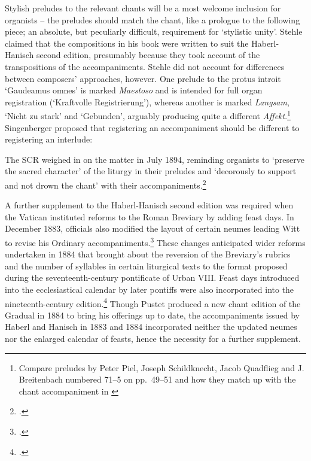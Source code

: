   {\cite[unpaginated `Vorbemerkung']{StehlePraeludiaorganiad1892}}
{Stylish preludes to the relevant chants will be a most welcome inclusion for organists -- the preludes should match the chant, like a prologue to the following piece; an absolute, but peculiarly difficult, requirement for `stylistic unity'.}
\noindent
Stehle claimed that the compositions in his book were written to suit the Haberl-Hanisch second edition, presumably because they took account of the transpositions of the accompaniments.
Stehle did not account for differences between composers' approaches, however.
One prelude to the protus introit `Gaudeamus omnes' is marked \emph{Maestoso} and is intended for full organ registration (`Kraftvolle Registrierung'), whereas another is marked \emph{Langsam}, `Nicht zu stark' and `Gebunden', arguably producing quite a different \emph{Affekt}.\footnote{Compare preludes by Peter Piel, Joseph Schildknecht, Jacob Quadflieg and J. Breitenbach numbered 71--5 on pp.~49--51 and how they match up with the chant accompaniment in \cite[2nd~ed., p.~27]{HanischOrganumcomitansad1883}}
Singenberger proposed that registering an accompaniment should be different to registering an interlude:

  {\cite[unpaginated preface]{SingenbergerOrganAccompanimentCantate1912}}
\noindent
The SCR weighed in on the matter in July 1894, reminding organists to `preserve the sacred character' of the liturgy in their preludes and `decorously to support and not drown the chant' with their accompaniments.\footcite[p.~141 \S{}6]{HayburnPapalLegislationSacred1979}

A further supplement to the Haberl-Hanisch second edition was required when the Vatican instituted reforms to the Roman Breviary by adding feast days.
In December 1883, officials also modified the layout of certain neumes leading Witt to revise his Ordinary accompaniments.\footcite[viii]{WittOrganumcomitansad1885}
These changes anticipated wider reforms undertaken in 1884 that brought about the reversion of the Breviary's rubrics and the number of syllables in certain liturgical texts to the format proposed during the seventeenth-century pontificate of Urban VIII.
Feast days introduced into the ecclesiastical calendar by later pontiffs were also incorporated into the nineteenth-century edition.\footcites[264--5]{BatiffolHistoirebreviaireromain1893}[For an Anglophone translation, see][286--8]{BatiffolHistoryRomanBreviary1898}
Though Pustet produced a new chant edition of the Gradual in 1884 to bring his offerings up to date, the accompaniments issued by Haberl and Hanisch in 1883 and 1884 incorporated neither the updated neumes nor the enlarged calendar of feasts, hence the necessity for a further supplement.

